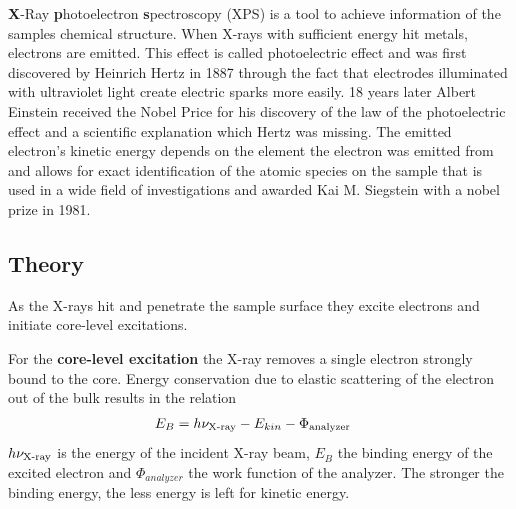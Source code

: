 \label{section:XPS} 
\textbf{X}-Ray \textbf{p}hotoelectron \textbf{s}pectroscopy (XPS) is a tool to achieve information of the samples chemical structure.
When X-rays with sufficient energy hit metals, electrons are emitted. This effect is called photoelectric effect and was first discovered by Heinrich Hertz in 1887 through the fact that electrodes illuminated with ultraviolet light create electric sparks more easily. \cite{hertz_ueber_1887} 18 years later Albert Einstein received the Nobel Price for his discovery of the law of the photoelectric effect\cite{_nobel_prize_1921} and a scientific explanation which Hertz was missing. The emitted electron's kinetic energy depends on the element the electron was emitted from and allows for exact identification of the atomic species on the sample that is used in a wide field of investigations and awarded Kai M. Siegstein with a nobel prize in 1981\cite{_noble_price_1981}.

\subsection{Theory}
As the X-rays hit and penetrate the sample surface they excite electrons and initiate core-level excitations.

For the \textbf{core-level excitation} the X-ray removes a single electron strongly bound to the core. Energy conservation due to elastic scattering of the electron out of the bulk results in the relation 
\begin{align}
E_B 	&=h\nu_{\textnormal{X-ray}}-E_{kin}-\Phi_{\textnormal{analyzer}}
\end{align}
 $h\nu_{\textnormal{X-ray}}$ is the energy of the incident X-ray beam, $E_B$ the binding energy of the excited electron and $\Phi_{analyzer}$ the work function of the analyzer. The stronger the binding energy, the less energy is left for kinetic energy.


